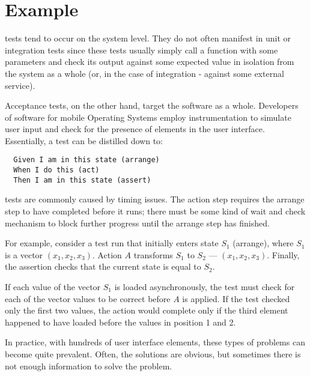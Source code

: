 \section{Example}
\label{sec:example}

\Flaky tests tend to occur on the system level. They do not often manifest in
unit or integration tests since these tests usually simply call a function with
some parameters and check its output against some expected value in isolation
from the system as a whole (or, in the case of integration - against some
external service).

Acceptance tests, on the other hand, target the software as a whole. Developers
of software for mobile Operating Systems employ instrumentation to simulate user
input and check for the presence of elements in the user interface. Essentially,
a test can be distilled down to:
\begin{verbatim}
  Given I am in this state (arrange)
  When I do this (act)
  Then I am in this state (assert)
\end{verbatim}

\Flaky tests are commonly caused by timing issues. The action step requires the
arrange step to have completed before it runs; there must be some kind of wait
and check mechanism to block further progress until the arrange step has
finished.

For example, consider a test run that initially enters state $S_{1}$ (arrange),
where $S_{1}$ is a vector $(x_{1},x_{2},x_{3})$. Action $A$ transforms $S_1$ to
$S_2$ --- $(x_{1},x_{2},x_{3})$. Finally, the assertion checks that the current
state is equal to $S_2$.

If each value of the vector $S_{1}$ is loaded asynchronously, the test must
check for each of the vector values to be correct before $A$ is applied. If the
test checked only the first two values, the action would complete only if the
third element happened to have loaded before the values in position 1 and 2.

In practice, with hundreds of user interface elements, these types of problems
can become quite prevalent. Often, the solutions are obvious, but sometimes
there is not enough information to solve the problem.
